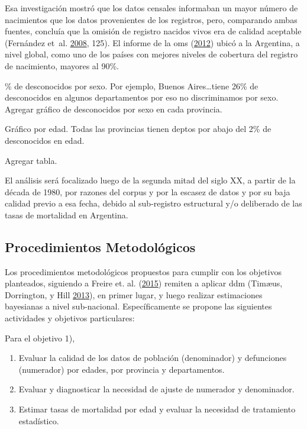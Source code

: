 \documentclass[12pt,spanish,]{article}
\providecommand{\tightlist}{%
  \setlength{\itemsep}{0pt}\setlength{\parskip}{0pt}}
\begin{document}
Esa investigación mostró que los datos censales informaban un mayor
número de nacimientos que los datos provenientes de los registros, pero,
comparando ambas fuentes, concluía que la omisión de registro nacidos
vivos era de calidad aceptable (Fernández et~al.
\protect\hyperlink{ref-FernandezEtAl2008}{2008}, 125). El informe de la
\gls{oms} (\protect\hyperlink{ref-OMS2012}{2012}) ubicó a la Argentina,
a nivel global, como uno de los países con mejores niveles de cobertura
del registro de nacimiento, mayores al 90\%.

\% de desconocidos por sexo. Por ejemplo, Buenos Aires\ldots{}tiene 26\%
de desconocidos en algunos departamentos por eso no discriminamos por
sexo. Agregar gráfico de desconocidos por sexo en cada provincia.

Gráfico por edad. Todas las provincias tienen deptos por abajo del 2\%
de desconocidos en edad.

Agregar tabla.

El análisis será focalizado luego de la segunda mitad del siglo XX, a
partir de la década de 1980, por razones del corpus y por la escasez de
datos y por su baja calidad previo a esa fecha, debido al sub-registro
estructural y/o deliberado de las tasas de mortalidad en Argentina.

\hypertarget{procedimientos-metodologicos}{%
\subsection{Procedimientos
Metodológicos}\label{procedimientos-metodologicos}}

Los procedimientos metodológicos propuestos para cumplir con los
objetivos planteados, siguiendo a Freire et. al.
(\protect\hyperlink{ref-FreireEtAl2015}{2015}) remiten a aplicar
\gls{ddm} (Timæus, Dorrington, y Hill
\protect\hyperlink{ref-TimaeusDorringtonHill2013}{2013}), en primer
lugar, y luego realizar estimaciones bayesianas a nivel sub-nacional.
Específicamente se propone las siguientes actividades y objetivos
particulares:

Para el objetivo 1),

\begin{enumerate}
\def\labelenumi{\alph{enumi}.}
\tightlist
\item
  Evaluar la calidad de los datos de población (denominador) y
  defunciones (numerador) por edades, por provincia y departamentos.
\item
  Evaluar y diagnosticar la necesidad de ajuste de numerador y
  denominador.
\item
  Estimar tasas de mortalidad por edad y evaluar la necesidad de
  tratamiento estadístico.
\end{enumerate}
\end{document}
